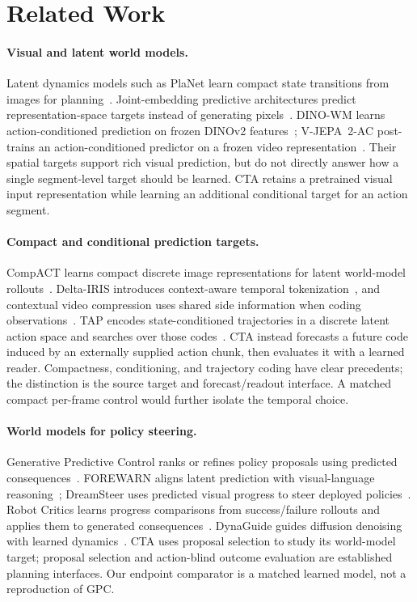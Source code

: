 \section{Related Work}
\label{sec:related}
\paragraph{Visual and latent world models.}
Latent dynamics models such as PlaNet learn compact state transitions from images for planning~\cite{hafner2019planet}. Joint-embedding predictive architectures predict representation-space targets instead of generating pixels~\cite{assran2023ijepa}. DINO-WM learns action-conditioned prediction on frozen DINOv2 features~\cite{zhou2025dinowm}; V-JEPA~2-AC post-trains an action-conditioned predictor on a frozen video representation~\cite{assran2025vjepa2}. Their spatial targets support rich visual prediction, but do not directly answer how a single segment-level target should be learned. CTA retains a pretrained visual input representation while learning an additional conditional target for an action segment.

\paragraph{Compact and conditional prediction targets.}
CompACT learns compact discrete image representations for latent world-model rollouts~\cite{kim2026compact}. Delta-IRIS introduces context-aware temporal tokenization~\cite{micheli2024deltairis}, and contextual video compression uses shared side information when coding observations~\cite{li2021dcvc}. TAP encodes state-conditioned trajectories in a discrete latent action space and searches over those codes~\cite{jiang2023tap}. CTA instead forecasts a future code induced by an externally supplied action chunk, then evaluates it with a learned reader. Compactness, conditioning, and trajectory coding have clear precedents; the distinction is the source target and forecast/readout interface. A matched compact per-frame control would further isolate the temporal choice.

\paragraph{World models for policy steering.}
Generative Predictive Control ranks or refines policy proposals using predicted consequences~\cite{qi2025gpc}. FOREWARN aligns latent prediction with visual-language reasoning~\cite{wu2025forewarn}; DreamSteer uses predicted visual progress to steer deployed policies~\cite{cui2026dreamsteer}. Robot Critics learns progress comparisons from success/failure rollouts and applies them to generated consequences~\cite{sudhakar2026critics}. DynaGuide guides diffusion denoising with learned dynamics~\cite{du2025dynaguide}. CTA uses proposal selection to study its world-model target; proposal selection and action-blind outcome evaluation are established planning interfaces. Our endpoint comparator is a matched learned model, not a reproduction of GPC.


